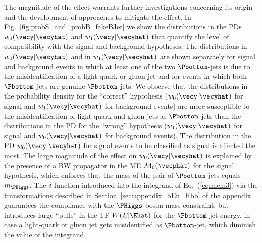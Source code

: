 The magnitude of the effect warrants further investigations concerning its origin and the development of approaches to mitigate the effect.
In Fig.~\ref{fig:probS_and_probB_fakeBJet} we show the distributions in the PDs $w_{0}(\vecy|\vecyhat)$ and $w_{1}(\vecy|\vecyhat)$
that quantify the level of compatibility with the signal and background hypotheses.
The distributions in $w_{0}(\vecy|\vecyhat)$ and in $w_{1}(\vecy|\vecyhat)$ are shown separately 
for signal and background events in which at least one of the two $\Pbottom$-jets is due to the misidentification of a light-quark or gluon jet
and for events in which both $\Pbottom$-jets are genuine $\Pbottom$-jets.
We observe that the distributions in the probability density for the ``correct'' hypothesis 
($w_{0}(\vecy|\vecyhat)$ for signal and $w_{1}(\vecy|\vecyhat)$ for background events)
are more susceptible to the misidentification of light-quark and gluon jets as $\Pbottom$-jets than the distributions in the PD for the ``wrong'' hypothesis 
($w_{1}(\vecy|\vecyhat)$ for signal and $w_{0}(\vecy|\vecyhat)$ for background events).
The distribution in the PD $w_{0}(\vecy|\vecyhat)$ for signal events to be classified as signal is affected the most.
The large magnitude of the effect on $w_{0}(\vecy|\vecyhat)$ is explained by the presence of a BW propagator in the ME $\mathcal{M}_{0}(\vecphat)$ for the signal hypothesis,
which enforces that the mass of the pair of $\Pbottom$-jets equals $m_{\PHiggs}$.
The $\delta$-function introduced into the integrand of Eq.~(\ref{eq:mem3}) via the transformations described in Section~\ref{sec:appendix_bEn_Hbb} of the appendix
guarantees the compliance with the $\PHiggs$ boson mass constraint,
but introduces large ``pulls'' in the TF $W(E|\Ehat)$ for the $\Pbottom$-jet energy,
in case a light-quark or gluon jet gets misidentified as $\Pbottom$-jet,
which diminish the value of the integrand.

